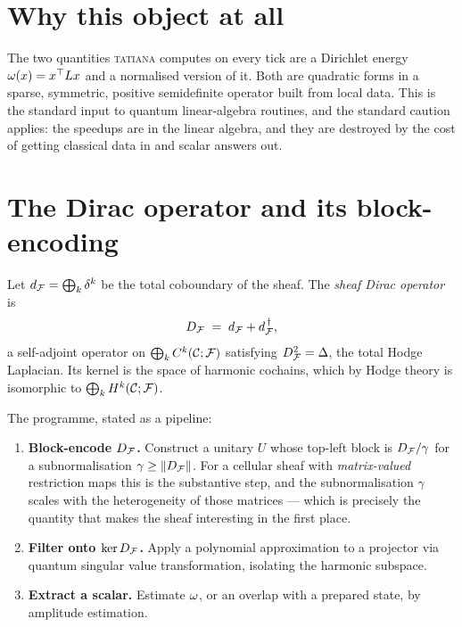 \section{Why this object at all}

The two quantities \textsc{tatiana} computes on every tick are a
Dirichlet energy $\omega(x)=x^\top L x$ and a normalised version of
it. Both are quadratic forms in a sparse, symmetric, positive
semidefinite operator built from local data. This is the standard input
to quantum linear-algebra routines, and the standard caution applies:
the speedups are in the linear algebra, and they are destroyed by the
cost of getting classical data in and scalar answers out.

\section{The Dirac operator and its block-encoding}

\begin{definition}\label{def:dirac}
Let $d_{\mathcal{F}}=\bigoplus_k\delta^k$ be the total coboundary of the sheaf.
The \emph{sheaf Dirac operator} is
\[
  D_{\mathcal{F}} \;=\; d_{\mathcal{F}}+d_{\mathcal{F}}^{\,\dagger},
\]
a self-adjoint operator on $\bigoplus_k C^{k}(\mathcal{C};\mathcal{F})$ satisfying
$D_{\mathcal{F}}^2=\Delta$, the total Hodge Laplacian. Its kernel is the space of
harmonic cochains, which by Hodge theory is isomorphic to
$\bigoplus_k H^{k}(\mathcal{C};\mathcal{F})$.
\end{definition}

The programme, stated as a pipeline:
\begin{enumerate}
  \item \textbf{Block-encode $D_{\mathcal{F}}$.} Construct a unitary $U$ whose
        top-left block is $D_{\mathcal{F}}/\gamma$ for a subnormalisation
        $\gamma\ge\left\lVert D_{\mathcal{F}} \right\rVert$. For a cellular sheaf with
        \emph{matrix-valued} restriction maps this is the substantive
        step, and the subnormalisation $\gamma$ scales with the
        heterogeneity of those matrices --- which is precisely the
        quantity that makes the sheaf interesting in the first place.
  \item \textbf{Filter onto $\ker D_{\mathcal{F}}$.} Apply a polynomial
        approximation to a projector via quantum singular value
        transformation, isolating the harmonic subspace.
  \item \textbf{Extract a scalar.} Estimate $\omega$, or an overlap
        with a prepared state, by amplitude estimation.
\end{enumerate}

